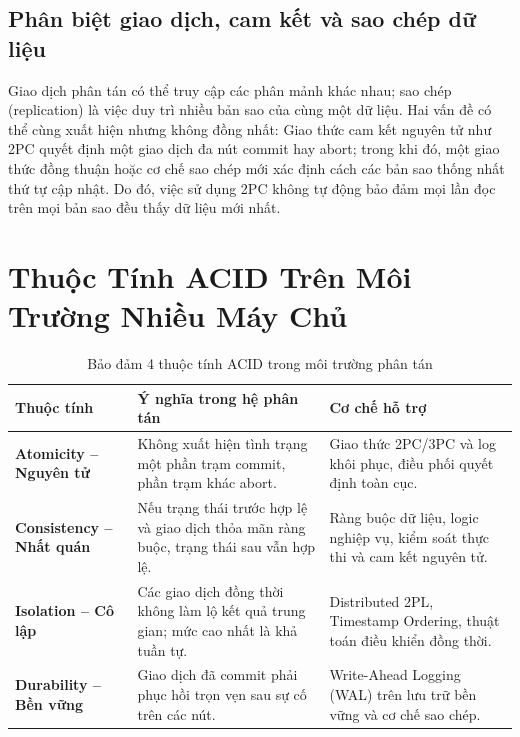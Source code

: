 \documentclass[12pt,a4paper]{report}
\begin{document}
\subsection{Phân biệt giao dịch, cam kết và sao chép dữ liệu}
Giao dịch phân tán có thể truy cập các phân mảnh khác nhau; sao chép (replication) là việc duy trì nhiều bản sao của cùng một dữ liệu. Hai vấn đề có thể cùng xuất hiện nhưng không đồng nhất: Giao thức cam kết nguyên tử như 2PC quyết định một giao dịch đa nút commit hay abort; trong khi đó, một giao thức đồng thuận hoặc cơ chế sao chép mới xác định cách các bản sao thống nhất thứ tự cập nhật. Do đó, việc sử dụng 2PC không tự động bảo đảm mọi lần đọc trên mọi bản sao đều thấy dữ liệu mới nhất.

\section{Thuộc Tính ACID Trên Môi Trường Nhiều Máy Chủ}

\begin{table}[!ht]
\centering
\small
\label{tab:distributed_acid}
\renewcommand{\arraystretch}{1.25}
\begin{tabularx}{\textwidth}{|>{\raggedright\arraybackslash\bfseries}p{3.2cm}|>{\raggedright\arraybackslash}X|>{\raggedright\arraybackslash}X|}
    \hline
    \textbf{Thuộc tính} & \textbf{Ý nghĩa trong hệ phân tán} & \textbf{Cơ chế hỗ trợ} \\ \hline
    Atomicity -- Nguyên tử & Không xuất hiện tình trạng một phần trạm commit, phần trạm khác abort. & Giao thức 2PC/3PC và log khôi phục, điều phối quyết định toàn cục. \\ \hline
    Consistency -- Nhất quán & Nếu trạng thái trước hợp lệ và giao dịch thỏa mãn ràng buộc, trạng thái sau vẫn hợp lệ. & Ràng buộc dữ liệu, logic nghiệp vụ, kiểm soát thực thi và cam kết nguyên tử. \\ \hline
    Isolation -- Cô lập & Các giao dịch đồng thời không làm lộ kết quả trung gian; mức cao nhất là khả tuần tự. & Distributed 2PL, Timestamp Ordering, thuật toán điều khiển đồng thời. \\ \hline
    Durability -- Bền vững & Giao dịch đã commit phải phục hồi trọn vẹn sau sự cố trên các nút. & Write-Ahead Logging (WAL) trên lưu trữ bền vững và cơ chế sao chép. \\ \hline
\end{tabularx}
\caption{Bảo đảm 4 thuộc tính ACID trong môi trường phân tán}
\end{table}
\end{document}
